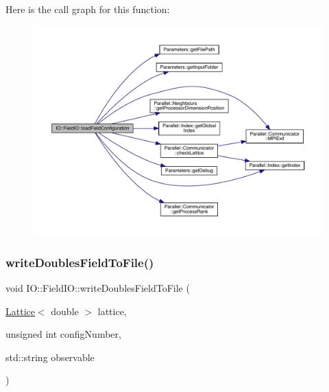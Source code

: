 Here is the call graph for this function\+:\nopagebreak
\begin{figure}[H]
\begin{center}
\leavevmode
\includegraphics[width=350pt]{class_i_o_1_1_field_i_o_afdd7f357ed71f7ff3ab1b5be987a51b5_cgraph}
\end{center}
\end{figure}
\mbox{\label{class_i_o_1_1_field_i_o_a4bfe0fd7890fe69b88fbbe3864fd00ae}} 
\subsubsection{\texorpdfstring{writeDoublesFieldToFile()}{writeDoublesFieldToFile()}}
{\footnotesize\ttfamily void I\+O\+::\+Field\+I\+O\+::write\+Doubles\+Field\+To\+File (\begin{DoxyParamCaption}\item[{\mbox{\hyperlink{class_lattice}{Lattice}}$<$ double $>$}]{lattice,  }\item[{unsigned int}]{config\+Number,  }\item[{std\+::string}]{observable }\end{DoxyParamCaption})\hspace{0.3cm}{\ttfamily [static]}}

